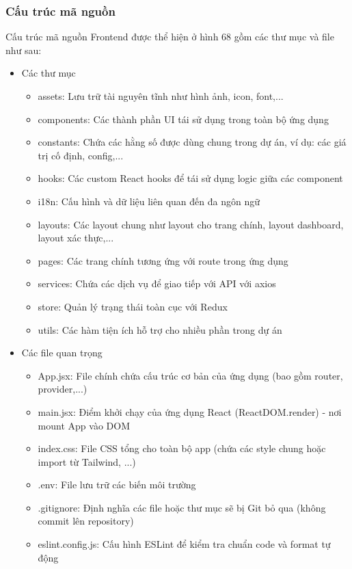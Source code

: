 \subsubsection{Cấu trúc mã nguồn}
Cấu trúc mã nguồn Frontend được thể hiện ở hình 68 gồm các thư mục và file như sau:
\begin{itemize}
    \item Các thư mục
    \begin{itemize}
        \item assets: Lưu trữ tài nguyên tĩnh như hình ảnh, icon, font,...
        \item components: Các thành phần UI tái sử dụng trong toàn bộ ứng dụng
        \item constants: Chứa các hằng số được dùng chung trong dự án, ví dụ: các giá trị cố định, config,...
        \item hooks: Các custom React hooks để tái sử dụng logic giữa các component
        \item i18n: Cấu hình và dữ liệu liên quan đến đa ngôn ngữ
        \item layouts: Các layout chung như layout cho trang chính, layout dashboard, layout xác thực,...
        \item pages: Các trang chính tương ứng với route trong ứng dụng
        \item services: Chứa các dịch vụ để giao tiếp với API với axios
        \item store: Quản lý trạng thái toàn cục với Redux
        \item utils: Các hàm tiện ích hỗ trợ cho nhiều phần trong dự án
    \end{itemize}
    \item Các file quan trọng
    \begin{itemize}
        \item App.jsx: File chính chứa cấu trúc cơ bản của ứng dụng (bao gồm router, provider,...)
        \item main.jsx: Điểm khởi chạy của ứng dụng React (ReactDOM.render) - nơi mount App vào DOM
        \item index.css: File CSS tổng cho toàn bộ app (chứa các style chung hoặc import từ Tailwind, ...)
        \item .env: File lưu trữ các biến môi trường
        \item .gitignore: Định nghĩa các file hoặc thư mục sẽ bị Git bỏ qua (không commit lên repository)
        \item eslint.config.js: Cấu hình ESLint để kiểm tra chuẩn code và format tự động

\end{itemize}
\end{itemize}

